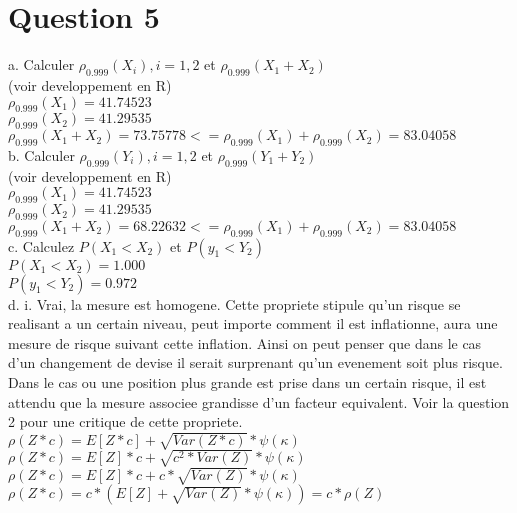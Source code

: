 \section{Question 5}

a. Calculer $\rho_{0.999}(X_i), i=1,2 $ et $\rho_{0.999}(X_1+X_2) $ \\
(voir developpement en R)\\

$ \rho_{0.999}(X_1) = 41.74523 $\\
$ \rho_{0.999}(X_2) =  41.29535 $\\
$ \rho_{0.999}(X_1 + X_2) =  73.75778 <= \rho_{0.999}(X_1) + \rho_{0.999}(X_2) = 83.04058$ \\


b. Calculer $\rho_{0.999}(Y_i), i=1,2 $ et $\rho_{0.999}(Y_1+Y_2) $ \\
(voir developpement en R)\\

$ \rho_{0.999}(X_1) = 41.74523 $\\
$ \rho_{0.999}(X_2) =  41.29535 $\\
$ \rho_{0.999}(X_1 + X_2) =  68.22632 <= \rho_{0.999}(X_1) + \rho_{0.999}(X_2) = 83.04058$ \\

c. Calculez $P(X_1 < X_2)$ et $P(y_1 < Y_2)$ \\
$P(X_1 < X_2) = 1.000$\\  
$P(y_1 < Y_2) = 0.972$\\

d. i. Vrai, la mesure est homogene. Cette propriete stipule qu'un risque se realisant a un certain niveau, peut importe comment il est inflationne, aura une mesure de risque suivant cette inflation. Ainsi on peut penser que dans le cas d'un changement de devise il serait surprenant qu'un evenement soit plus risque. Dans le cas ou une position plus grande est prise dans un certain risque, il est attendu que la mesure associee grandisse d'un facteur equivalent. Voir la question 2 pour une critique de cette propriete.\\

$\rho(Z*c) = E[Z*c] + \sqrt{Var(Z*c)} * \psi(\kappa)$\\
$\rho(Z*c) = E[Z]*c + \sqrt{c^2*Var(Z)} * \psi(\kappa)$\\
$\rho(Z*c) = E[Z]*c + c*\sqrt{Var(Z)} * \psi(\kappa)$\\
$\rho(Z*c) = c * (E[Z] + \sqrt{Var(Z)} * \psi(\kappa)) = c*\rho(Z)$\\

